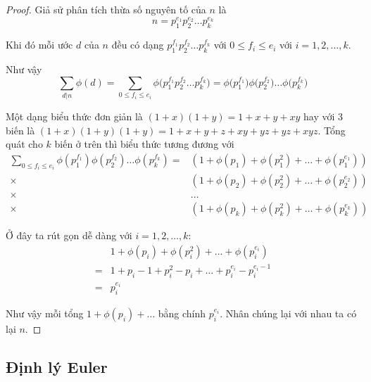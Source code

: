 \begin{proof}
    Giả sử phân tích thừa số nguyên tố của $n$ là 
    \begin{equation*}
        n = p_1^{e_1} p_2^{e_2} \ldots p_k^{e_k}
    \end{equation*}

    Khi đó mỗi ước $d$ của $n$ đều có dạng $p_1^{f_1} p_2^{f_2} \ldots p_k^{f_k}$ với $0 \leqslant f_i \leqslant e_i$ với $i = 1, 2, \ldots, k$.

    Như vậy
    \begin{equation*}
        \sum_{d | n} \phi(d) = \sum_{0 \leqslant f_i \leqslant e_i} \phi\Big(p_1^{f_1} p_2^{f_2} \ldots p_k^{f_k}\Big)
                            = \phi\Big(p_1^{f_1}\Big) \phi\Big(p_2^{f_2}\Big) \ldots \phi\Big(p_k^{f_k}\Big)
    \end{equation*}

    Một dạng biểu thức đơn giản là $(1+x)(1+y) = 1+x+y+xy$ hay với 3 biến là $(1+x)(1+y)(1+y) = 1 + x + y + z + xy + yz + yz + xyz$. Tổng quát cho $k$ biến ở trên thì biểu thức tương đương với
    \begin{align*}
        \sum_{0 \leqslant f_i \leqslant e_i} \phi(p_1^{f_1}) \phi(p_2^{f_2}) \ldots
        \phi(p_k^{f_k}) = & (1 + \phi(p_1) + \phi(p_1^2) + \ldots + \phi(p_1^{e_1})) \\
        \times & (1 + \phi(p_2) + \phi(p_2^2) + \ldots + \phi(p_2^{e_2})) \\
        \times & \ldots \\
        \times & (1 + \phi(p_k) + \phi(p_k^2) + \ldots + \phi(p_k^{e_k}))
    \end{align*}

    Ở đây ta rút gọn dễ dàng với $i = 1, 2, \ldots, k$:
    \begin{align*}
        & 1 + \phi(p_i) + \phi(p_i^2) + \ldots + \phi(p_i^{e_i}) \\
        = & 1 + p_i - 1 + p_i^2 - p_i + \ldots + p_i^{e_i} - p_i^{e_i-1} \\
        = & p_i^{e_i}
    \end{align*}

    Như vậy mỗi tổng $1 + \phi(p_i) + \ldots$ bằng chính $p_i^{e_i}$. Nhân chúng lại với nhau ta có lại $n$.
\end{proof}

\subsection*{Định lý Euler}

